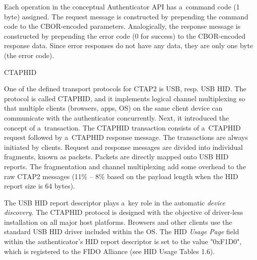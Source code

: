 Each operation in the conceptual Authenticator API has a~command code (1 byte) assigned. The request message is constructed by prepending the command code to the CBOR-encoded parameters. Analogically, the response message is constructed by prepending the error code (0 for success) to the CBOR-encoded response data. Since error responses do not have any data, they are only one byte (the error code).


\secc CTAPHID

One of the defined transport protocols for CTAP2 is USB, resp. USB HID. The protocol is called CTAPHID, and it implements logical channel multiplexing so that multiple clients (browsers, apps, OS) on the same client device can communicate with the authenticator concurrently. Next, it introduced the concept of a~transaction. The CTAPHID transaction consists of a~CTAPHID request followed by a~CTAPHID response message. The transactions are always initiated by clients. Request and response messages are divided into individual fragments, known as packets. Packets are directly mapped onto USB HID reports. The fragmentation and channel multiplexing add some overhead to the raw CTAP2 messages (11\% – 8\% based on the payload length when the HID report size is 64 bytes).

The USB HID report descriptor plays a~key role in the automatic \textit{device discovery}. The CTAPHID protocol is designed with the objective of driver-less installation on all major host platforms. Browsers and other clients use the standard USB HID driver included within the OS. The HID \textit{Usage Page} field within the authenticator’s HID report descriptor is set to the value "0xF1D0", which is registered to the FIDO Alliance (see HID Usage Tables 1.6).


